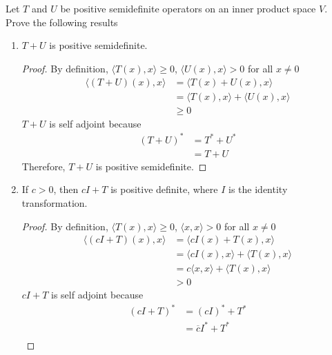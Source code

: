 \documentclass[11pt]{scrartcl}
\begin{document}
\section{}
Let $T$ and $U$ be positive semidefinite operators on an inner product space $V$. Prove the following
results
\begin{enumerate}[label=\alph*.]
	\item {
	      $T + U$ is positive semidefinite.
	      \begin{proof}
		      By definition,  $\langle T(x),x \rangle \geq 0$, $\langle U(x),x \rangle > 0$ for all $x \neq 0$
		      \begin{align*}
			      \langle (T + U)(x),x \rangle & = \langle T(x) + U(x),x \rangle                     \\
			                                   & = \langle T(x) ,x \rangle  + \langle U(x),x \rangle \\
			                                   & \geq 0
		      \end{align*}
		      $T + U$ is self adjoint because
		      \begin{align*}
			      (T + U)^* & = T^* + U^* \\
			                & = T + U
		      \end{align*}
		      Therefore, $T + U$ is positive semidefinite.
	      \end{proof}
	      }
	\item{
	      If $c > 0$, then $cI + T$ is positive definite, where $I$ is the identity transformation.
	      \begin{proof}
		      By definition, $\langle T(x),x \rangle \geq 0$, $\langle x,x \rangle > 0$ for all $x \neq 0$
		      \begin{align*}
			      \langle (cI + T)(x),x \rangle & = \langle cI(x) + T(x),x \rangle                      \\
			                                    & = \langle cI(x) ,x \rangle  + \langle  T(x),x \rangle \\
			                                    & = c \langle x ,x \rangle  + \langle  T(x),x \rangle   \\
			                                    & > 0
		      \end{align*}
		      $cI + T$ is self adjoint because
		      \begin{align*}
			      (cI + T)^* & = (cI)^* + T^*          \\
			                 & = \overline{c}I^* + T^* \\

\end{align*}
\end{proof}}
\end{enumerate}
\end{document}
